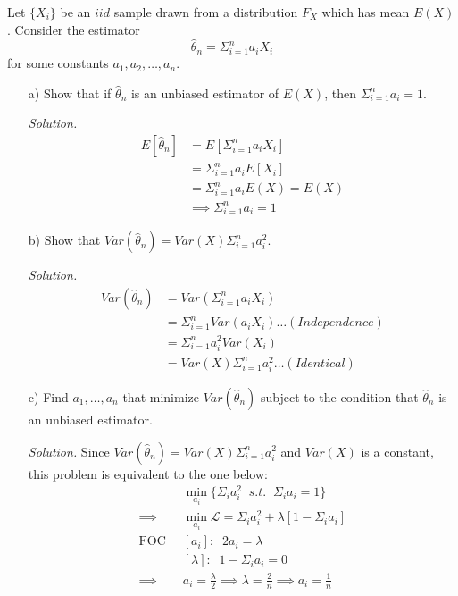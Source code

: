 \documentclass[
]{article}
\begin{document}
Let \(\{X_i\}\) be an \(iid\) sample drawn from a distribution \(F_X\)
which has mean \(E(X)\). Consider the estimator
\[\hat{\theta}_n = \Sigma ^n _{i=1} a_i X_i\] for some constants
\(a_1, a_2, \dots, a_n\).

\begin{enumerate} 

\item[a)] Show that if $\hat{\theta}_n$ is an unbiased estimator of $E (X )$, then $\Sigma ^n _{i=1} a_i = 1$.  
  
\textit{Solution.} 
\[\begin{aligned}
E[\hat{\theta}_n] &= E[\Sigma ^n _{i=1} a_i X_i] \\
&= \Sigma ^n _{i=1} a_i E[X_i] \\
&= \Sigma ^n _{i=1} a_i E(X) = E(X) \\ 
&\implies \Sigma ^n _{i=1} a_i = 1
\end{aligned}\]

\item[b)] Show that $Var(\hat{\theta}_n) = Var(X) \Sigma ^n _{i=1} a_i^2$.  
  
\textit{Solution.} 
\[\begin{aligned}
Var(\hat{\theta}_n) &= Var(\Sigma ^n _{i=1} a_i X_i) \\
&= \Sigma ^n _{i=1} Var(a_iX_i) \dots (Independence) \\
&=  \Sigma ^n _{i=1} a_i ^2 Var(X_i)  \\
&= Var(X)  \Sigma ^n _{i=1} a_i^2 \dots (Identical) 
\end{aligned}\]

\item[c)] Find $a_1, \dots, a_n$ that minimize $Var(\hat{\theta}_n)$ subject to the condition that $\hat{\theta}_n$ is an unbiased estimator.  
  
\textit{Solution. }
Since $Var(\hat{\theta}_n) = Var(X) \Sigma ^n _{i=1} a_i^2$ and $Var(X)$ is a constant, this problem is equivalent to the one below:
\[\begin{aligned}
&\min_{a_i} \{\Sigma_i a_i^2 \; \; s.t. \; \; \Sigma_i a_i = 1\} \\
\implies &\min_{a_i} \mathcal{L} =  \Sigma_i a_i^2 + \lambda[1 - \Sigma_i a_i] \\
\text{FOC} \; \; &[a_i]: \;\; 2a_i = \lambda \\
&[\lambda]: \;\; 1 - \Sigma_i a_i = 0 \\
\implies &a_i = \frac{\lambda}{2} \implies\lambda = \frac{2}{n} \implies a_i = \frac{1}{n}
\end{aligned}\]

\end{enumerate}
\end{document}
